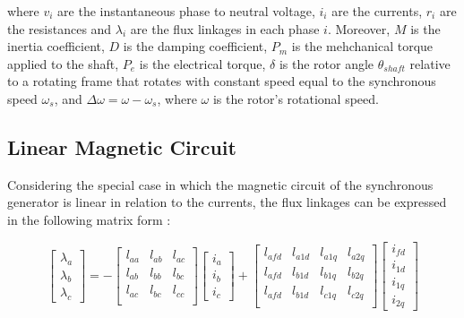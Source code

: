 \noindent where $v_{i}$ are the instantaneous phase to neutral voltage, $i_i$
are the currents, $r_{i}$ are the resistances and $\lambda_{i}$ are the flux
linkages in each phase $i$. Moreover, $M$ is the inertia coefficient, $D$ is the
damping coefficient, $P_m$ is the mehchanical torque applied to the shaft, $P_e$
is the electrical torque, $\delta$ is the rotor angle $\theta_{shaft}$ relative
to a rotating frame that rotates with constant speed equal to the synchronous
speed $\omega_s$, and $\Delta\omega = \omega - \omega_s$, where $\omega$ is the
rotor's rotational speed.

\subsection{Linear Magnetic Circuit}

Considering the special case in which the magnetic circuit of the synchronous
generator is linear in relation to the currents, the flux linkages can be
expressed in the following matrix form \cite{siva2022modeling}:

\begin{equation}
    \begin{bmatrix}
        \lambda_a \\ \lambda_b \\ \lambda_c
    \end{bmatrix}
    =
    - \begin{bmatrix}
        l_{aa} & l_{ab} & l_{ac} \\
        l_{ab} & l_{bb} & l_{bc} \\
        l_{ac} & l_{bc} & l_{cc} \\
    \end{bmatrix}
    \begin{bmatrix}
        i_a \\ i_b \\ i_c
    \end{bmatrix}
    + \begin{bmatrix}
        l_{afd} & l_{a1d} & l_{a1q} & l_{a2q}\\
        l_{afd} & l_{b1d} & l_{b1q} & l_{b2q}\\
        l_{afd} & l_{b1d} & l_{c1q} & l_{c2q}\\
    \end{bmatrix}
    \begin{bmatrix}
        i_{fd} \\ i_{1d} \\ i_{1q} \\ i_{2q}
    \end{bmatrix}
    \label{eq:lin_circuit_stator}
\end{equation}

